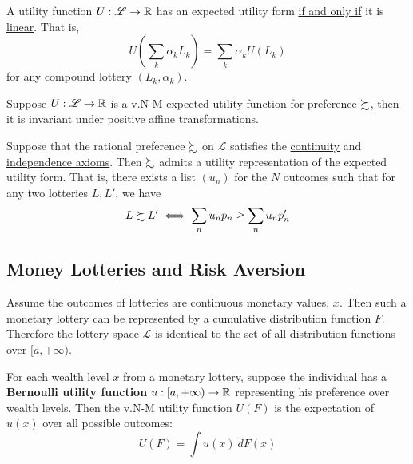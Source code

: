 \documentclass{article}
\begin{document}
	 		\begin{proposition}[6.B.1]
	 			A utility function $U: \mathscr{L} \to \mathbb{R}$ has an expected utility form \ul{if and only if} it is \ul{linear}. That is, 
	 			\begin{equation}
	 				U(\sum_k \alpha_k L_k) = \sum_k \alpha_k U(L_k)
	 			\end{equation}
	 			for any compound lottery $(L_k, \alpha_k)$.
	 		\end{proposition}
	 		
	 		\begin{proposition}[6.B.2]
	 			Suppose $U: \mathscr{L} \to \mathbb{R}$ is a v.N-M expected utility function for preference $\succsim$, then it is invariant under positive affine transformations.
	 		\end{proposition}
	 		
	 		\begin{proposition}
	 			Suppose that the rational preference $\succsim$ on $\mathscr{L}$ satisfies the \ul{continuity} and \ul{independence axioms}. Then $\succsim$ admits a utility representation of the expected utility form. That is, there exists a list $(u_n)$ for the $N$ outcomes such that for any two lotteries $L, L'$, we have
	 			\begin{equation}
	 				L \succsim L' \iff \sum_n u_n p_n \geq \sum_n u_n p_n'
	 			\end{equation}
	 		\end{proposition}
	 	
	 	\subsection{Money Lotteries and Risk Aversion}
	 		\begin{assumption}
	 			Assume the outcomes of lotteries are continuous monetary values, $x$. Then such a monetary lottery can be represented by a cumulative distribution function $F$. Therefore the lottery space $\mathscr{L}$ is identical to the set of all distribution functions over $[a, +\infty)$.
	 		\end{assumption}
	 		
	 		\begin{remark}
	 			For each wealth level $x$ from a monetary lottery, suppose the individual has a \textbf{Bernoulli utility function} $u: [a, +\infty) \to \mathbb{R}$ representing his preference over wealth levels. Then the v.N-M utility function $U(F)$ is the expectation of $u(x)$ over all possible outcomes:
	 			\begin{equation}
	 				U(F) = \int u(x)\ dF(x)
	 			\end{equation}
	 		\end{remark}
	 		
\end{document}
